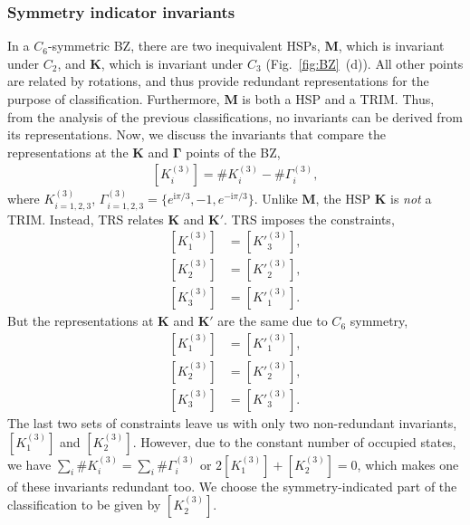 \subsubsection*{Symmetry indicator invariants}
In a $C_6$-symmetric BZ, there are two inequivalent HSPs, $\mathbf{M}$, which is invariant under $C_2$, and $\mathbf{K}$, which is invariant under $C_3$ (Fig.~\ref{fig:BZ}~(d)). All other points are related by rotations, and thus provide redundant representations for the purpose of classification. Furthermore,  $\mathbf{M}$ is both a HSP and a TRIM. Thus, from the analysis of the previous classifications, no invariants can be derived from its representations. Now, we discuss the invariants that compare the representations at the $\mathbf{K}$ and $\mathbf{\Gamma}$ points of the BZ,
\begin{equation} 
\begin{aligned}
[K^{(3)}_i]= \#K^{(3)}_i - \#\Gamma^{(3)}_i,
\end{aligned} 
\end{equation}
where $K^{(3)}_{i=1,2,3}$, $\Gamma^{(3)}_{i=1,2,3}=\{e^{\mathrm{i} \pi/3},-1,e^{-\mathrm{i} \pi/3}\}$. Unlike $\mathbf{M}$, the HSP $\mathbf{K}$ is \emph{not} a TRIM. Instead, TRS relates $\mathbf{K}$ and $\mathbf{K'}$. TRS imposes the constraints,
\begin{equation}
 \begin{aligned}
[K^{(3)}_1] &= [K'^{(3)}_3], \\
[K^{(3)}_2] &= [K'^{(3)}_2], \\
[K^{(3)}_3] &= [K'^{(3)}_1].
\end{aligned} 
\label{eq:C6_constraints}
\end{equation}
But the representations at $\mathbf{K}$ and $\mathbf{K'}$ are the same due to $C_6$ symmetry,
\begin{equation}
 \begin{aligned}
[K^{(3)}_1] &= [K'^{(3)}_1], \\
[K^{(3)}_2] &= [K'^{(3)}_2], \\
[K^{(3)}_3] &= [K'^{(3)}_3].
\end{aligned} 
\end{equation}
The last two sets of constraints leave us with only two non-redundant invariants, $[K^{(3)}_1]$ and $[K^{(3)}_2]$. However, due to the constant number of occupied states, we have $\sum_i \# K^{(3)}_i = \sum_i \# \Gamma^{(3)}_i$ or $2[K^{(3)}_1]+[K^{(3)}_2]=0$, which makes one of these invariants redundant too. We choose the symmetry-indicated part of the classification to be given by $[K^{(3)}_2]$.

